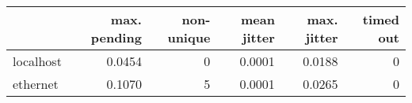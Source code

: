 \begin{tabular}{l|rrrrr}
\rowcolor{gray!50}
 & max. pending & non-unique & mean jitter & max. jitter & timed out\\\hline
localhost & 0.0454 & 0 & 0.0001 & 0.0188 & 0 \\
ethernet & 0.1070 & 5 & 0.0001 & 0.0265 & 0 \\
\end{tabular}

